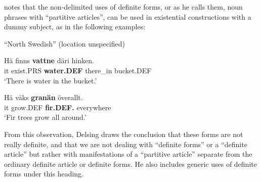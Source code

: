 
\citet[51]{Delsing1993} notes that the non-delimited uses of definite forms, or as he calls them, noun phrases with “partitive articles”, can be used in existential constructions with a dummy subject, as in the following examples: 


\item 

“North Swedish” (location unspecified)



\item 


 \ea\label{}
\gll Hä  finns  \textbf{vattne} däri  hinken.\\


it  exist.PRS  \textbf{water.DEF} there\_in  bucket.DEF\\

\glt ‘There is water in the bucket.’

\z

\item 


 \ea\label{}
\gll Hä  väks  \textbf{granän} överallt.\\


it  grow.DEF  \textbf{fir.DEF.} everywhere\\

\glt ‘Fir trees grow all around.’

\z

From this observation, Delsing draws the conclusion that these forms are not really definite, and that we are not dealing with “definite forms” or a “definite article” but rather with manifestations of a “partitive article” separate from the ordinary definite article or definite forms. He also includes generic uses of definite forms under this heading. 


